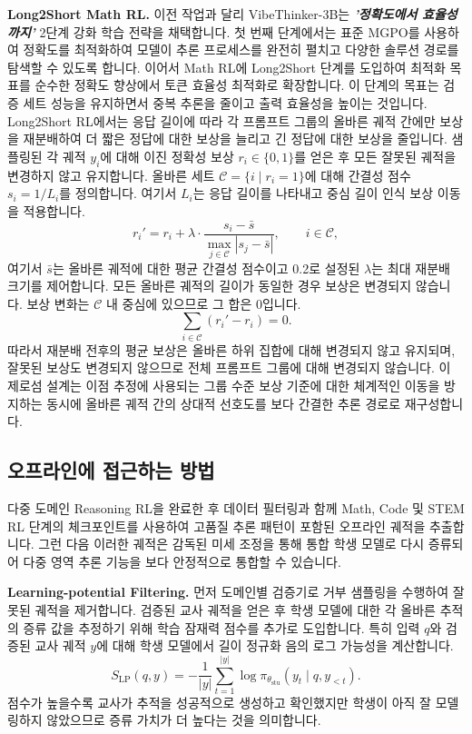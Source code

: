 \documentclass{article}
\begin{document}
\textbf{Long2Short Math RL.} 이전 작업과 달리 VibeThinker-3B는 \textbf{\textit{'정확도에서 효율성까지'}} 2단계 강화 학습 전략을 채택합니다. 첫 번째 단계에서는 표준 MGPO를 사용하여 정확도를 최적화하여 모델이 추론 프로세스를 완전히 펼치고 다양한 솔루션 경로를 탐색할 수 있도록 합니다. 이어서 Math RL에 Long2Short 단계를 도입하여 최적화 목표를 순수한 정확도 향상에서 토큰 효율성 최적화로 확장합니다. 이 단계의 목표는 검증 세트 성능을 유지하면서 중복 추론을 줄이고 출력 효율성을 높이는 것입니다.
Long2Short RL에서는 응답 길이에 따라 각 프롬프트 그룹의 올바른 궤적 간에만 보상을 재분배하여 더 짧은 정답에 대한 보상을 늘리고 긴 정답에 대한 보상을 줄입니다. 샘플링된 각 궤적 $y_i$에 대해 이진 정확성 보상 $r_i\in\{0,1\}$를 얻은 후 모든 잘못된 궤적을 변경하지 않고 유지합니다. 올바른 세트 $\mathcal{C}=\{i\mid r_i=1\}$에 대해 간결성 점수 $s_i=1/L_i$를 정의합니다. 여기서 $L_i$는 응답 길이를 나타내고 중심 길이 인식 보상 이동을 적용합니다.
\[
r_i' = r_i + \lambda \cdot
\frac{s_i-\bar{s}}{\max_{j\in\mathcal{C}} |s_j-\bar{s}|},
\qquad i\in\mathcal{C},
\]
여기서 $\bar{s}$는 올바른 궤적에 대한 평균 간결성 점수이고 0.2로 설정된 $\lambda$는 최대 재분배 크기를 제어합니다. 모든 올바른 궤적의 길이가 동일한 경우 보상은 변경되지 않습니다. 보상 변화는 $\mathcal{C}$ 내 중심에 있으므로 그 합은 0입니다.
\[
\sum_{i\in\mathcal{C}}(r_i'-r_i)=0.
\]
따라서 재분배 전후의 평균 보상은 올바른 하위 집합에 대해 변경되지 않고 유지되며, 잘못된 보상도 변경되지 않으므로 전체 프롬프트 그룹에 대해 변경되지 않습니다. 이 제로섬 설계는 이점 추정에 사용되는 그룹 수준 보상 기준에 대한 체계적인 이동을 방지하는 동시에 올바른 궤적 간의 상대적 선호도를 보다 간결한 추론 경로로 재구성합니다.


\subsection{오프라인에 접근하는 방법}

다중 도메인 Reasoning RL을 완료한 후 데이터 필터링과 함께 Math, Code 및 STEM RL 단계의 체크포인트를 사용하여 고품질 추론 패턴이 포함된 오프라인 궤적을 추출합니다. 그런 다음 이러한 궤적은 감독된 미세 조정을 통해 통합 학생 모델로 다시 증류되어 다중 영역 추론 기능을 보다 안정적으로 통합할 수 있습니다.

\textbf{Learning-potential Filtering.} 먼저 도메인별 검증기로 거부 샘플링을 수행하여 잘못된 궤적을 제거합니다. 검증된 교사 궤적을 얻은 후 학생 모델에 대한 각 올바른 추적의 증류 값을 추정하기 위해 학습 잠재력 점수를 추가로 도입합니다. 특히 입력 $q$와 검증된 교사 궤적 $y$에 대해 학생 모델에서 길이 정규화 음의 로그 가능성을 계산합니다.
\begin{equation}
S_{\mathrm{LP}}(q,y)
=
-\frac{1}{|y|}
\sum_{t=1}^{|y|}
\log \pi_{\theta_{\mathrm{stu}}}(y_t \mid q,y_{<t}).
\end{equation}
점수가 높을수록 교사가 추적을 성공적으로 생성하고 확인했지만 학생이 아직 잘 모델링하지 않았으므로 증류 가치가 더 높다는 것을 의미합니다.
\end{document}
